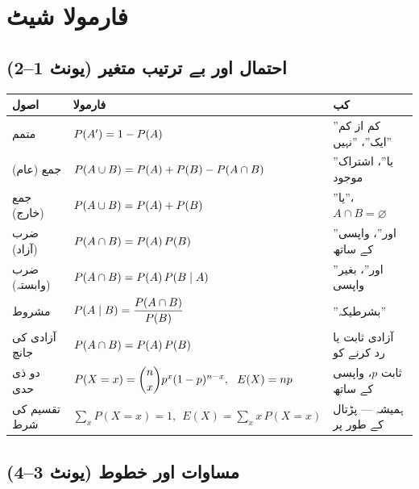 
\section*{فارمولا شیٹ}

\subsection*{احتمال اور بے ترتیب متغیر (یونٹ \textenglish{1--2})}

\begin{center}
\begin{tabular}{@{}p{3.6cm} p{6.0cm} p{5.4cm}@{}}
\toprule
\textbf{اصول} & \textbf{فارمولا} & \textbf{کب} \\
\midrule
متمم        & \(P\!\left(A'\right)=1-P\!\left(A\right)\) & ''کم از کم ایک''، ''نہیں'' \\
جمع (عام)   & \(P\!\left(A\cup B\right)=P\!\left(A\right)+P\!\left(B\right)-P\!\left(A\cap B\right)\) & ''یا''، اشتراک موجود \\
جمع (خارج)  & \(P\!\left(A\cup B\right)=P\!\left(A\right)+P\!\left(B\right)\) & ''یا''، \(A\cap B=\varnothing\) \\
ضرب (آزاد)  & \(P\!\left(A\cap B\right)=P\!\left(A\right)P\!\left(B\right)\) & ''اور''، واپسی کے ساتھ \\
ضرب (وابستہ)& \(P\!\left(A\cap B\right)=P\!\left(A\right)P\!\left(B\mid A\right)\) & ''اور''، بغیر واپسی \\
مشروط       & \(P\!\left(A\mid B\right)=\dfrac{P\!\left(A\cap B\right)}{P\!\left(B\right)}\) & ''بشرطیکہ'' \\
آزادی کی جانچ & \(P\!\left(A\cap B\right)=P\!\left(A\right)P\!\left(B\right)\) & آزادی ثابت یا رد کرنے کو \\
دو ذی حدی   & \(P(X=x)=\dbinom{n}{x}p^{x}(1-p)^{n-x},\ \ E(X)=np\) & ثابت \(p\)، واپسی کے ساتھ \\
تقسیم کی شرط & \(\sum_x P(X=x)=1,\ \ E(X)=\sum_x x\,P(X=x)\) & ہمیشہ --- پڑتال کے طور پر \\
\bottomrule
\end{tabular}
\end{center}

\subsection*{مساوات اور خطوط (یونٹ \textenglish{3--4})}

